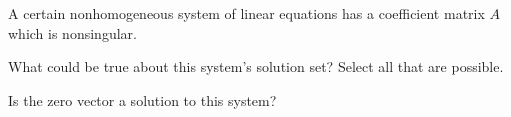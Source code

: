 \documentclass{ximera}
\author{Rob Beezer}
\begin{document}
\begin{exercise}
  A certain nonhomogeneous system of linear equations has a
  coefficient matrix $A$ which is nonsingular.
  
  What could be true about this system's solution set?  Select all that
  are possible.
  \begin{selectAll}
  \end{selectAll}
  
  Is the zero vector a solution to this system?
  \begin{multipleChoice}
  \end{multipleChoice}
\end{exercise}
\end{document}

